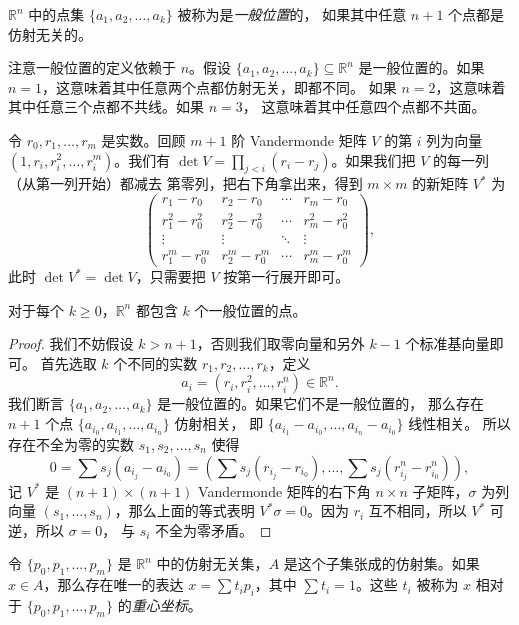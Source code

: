 \documentclass[fontset=none]{Notes}
\begin{document}
\begin{definition}
  $\mathbb{R}^n$ 中的点集 $\{a_1,a_2,\dots,a_k\}$ 被称为是\emph{一般位置}的，
  如果其中任意 $n+1$ 个点都是仿射无关的。
\end{definition}

注意一般位置的定义依赖于 $n$。假设 $\{a_1,a_2,\dots,a_k\}\subseteq \mathbb{R}^n$
是一般位置的。如果 $n=1$，这意味着其中任意两个点都仿射无关，即都不同。
如果 $n=2$，这意味着其中任意三个点都不共线。如果 $n=3$，
这意味着其中任意四个点都不共面。

令 $r_0,r_1,\dots,r_m$ 是实数。回顾 $m+1$ 阶 Vandermonde 矩阵
$V$ 的第 $i$ 列为向量 $(1,r_i,r_i^2,\dots,r_i^m)$。我们有 
$\det V=\prod_{j<i}(r_i-r_j)$。如果我们把 $V$ 的每一列（从第一列开始）都减去
第零列，把右下角拿出来，得到 $m\times m$ 的新矩阵 $V^*$ 为
\[
  \begin{pmatrix}
    r_1 -r_0 & r_2-r_0 & \cdots & r_m-r_0\\
    r_1^2-r_0^2 & r_2^2-r_0^2 & \cdots & r_m^2-r_0^2\\
    \vdots & \vdots & \ddots & \vdots \\
    r_1^m-r_0^m & r_2^m-r_0^m & \cdots & r_m^m-r_0^m 
  \end{pmatrix},
\]
此时 $\det V^*=\det V$，只需要把 $V$ 按第一行展开即可。

\begin{theorem}
  对于每个 $k\ge 0$，$\mathbb{R}^n$ 都包含 $k$ 个一般位置的点。
\end{theorem}
\begin{proof}
  我们不妨假设 $k>n+1$，否则我们取零向量和另外 $k-1$ 个标准基向量即可。
  首先选取 $k$ 个不同的实数 $r_1,r_2,\dots,r_k$，定义
  \[
    a_i=(r_i,r_i^2,\dots,r_i^n)\in \mathbb{R}^n.
  \]
  我们断言 $\{a_1,a_2,\dots,a_k\}$ 是一般位置的。如果它们不是一般位置的，
  那么存在 $n+1$ 个点 $\{a_{i_0},a_{i_1},\dots,a_{i_n}\}$ 仿射相关，
  即 $\{a_{i_1}-a_{i_0},\dots,a_{i_n}-a_{i_0}\}$ 线性相关。
  所以存在不全为零的实数 $s_1,s_2,\dots,s_n$ 使得
  \[
    0=\sum s_j(a_{i_j}-a_{i_0})=
    \left(\sum s_j(r_{i_j}-r_{i_0}),\dots,\sum s_j(r_{i_j}^n-r_{i_0}^n)\right),
  \]
  记 $V^*$ 是 $(n+1)\times (n+1)$ Vandermonde 矩阵的右下角 $n\times n$
  子矩阵，$\sigma$ 为列向量 $(s_1,\dots,s_n)$，那么上面的等式表明
  $V^*\sigma=0$。因为 $r_i$ 互不相同，所以 $V^*$ 可逆，所以 $\sigma=0$，
  与 $s_i$ 不全为零矛盾。
\end{proof}

\begin{definition}
  令 $\{p_0,p_1,\dots,p_m\}$ 是 $\mathbb{R}^n$ 中的仿射无关集，$A$
  是这个子集张成的仿射集。如果 $x\in A$，那么存在唯一的表达 
  $x=\sum t_ip_i$，其中 $\sum t_i=1$。这些 $t_i$ 被称为 $x$
  相对于 $\{p_0,p_1,\dots,p_m\}$ 的\emph{重心坐标}。
\end{definition}
\end{document}
